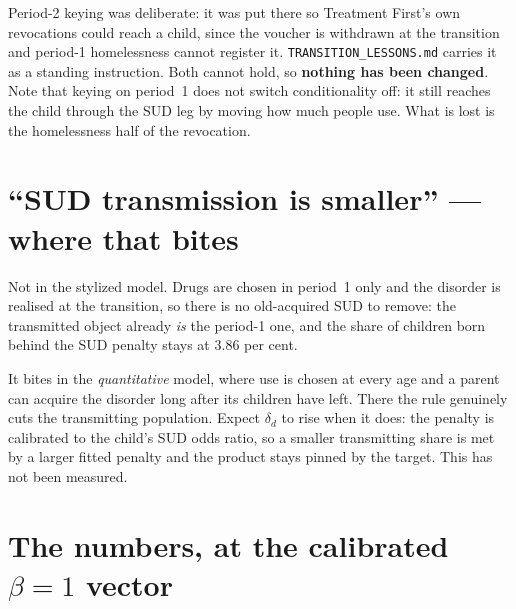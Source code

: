 \documentclass[11pt]{article}
\begin{document}
Period-2 keying was deliberate: it was put there so Treatment First's own
revocations could reach a child, since the voucher is withdrawn at the
transition and period-1 homelessness cannot register it.
\texttt{TRANSITION\_LESSONS.md} carries it as a standing instruction. Both
cannot hold, so \textbf{nothing has been changed}. Note that keying on period~1
does not switch conditionality off: it still reaches the child through the SUD
leg by moving how much people use. What is lost is the homelessness half of the
revocation.

\section{``SUD transmission is smaller'' --- where that bites}

Not in the stylized model. Drugs are chosen in period~1 only and the disorder is
realised at the transition, so there is no old-acquired SUD to remove: the
transmitted object already \emph{is} the period-1 one, and the share of children
born behind the SUD penalty stays at $3.86$ per cent.

It bites in the \emph{quantitative} model, where use is chosen at every age and
a parent can acquire the disorder long after its children have left. There the
rule genuinely cuts the transmitting population. Expect $\delta_d$ to rise when
it does: the penalty is calibrated to the child's SUD odds ratio, so a smaller
transmitting share is met by a larger fitted penalty and the product stays
pinned by the target. This has not been measured.

\section{The numbers, at the calibrated $\beta=1$ vector}
\end{document}
